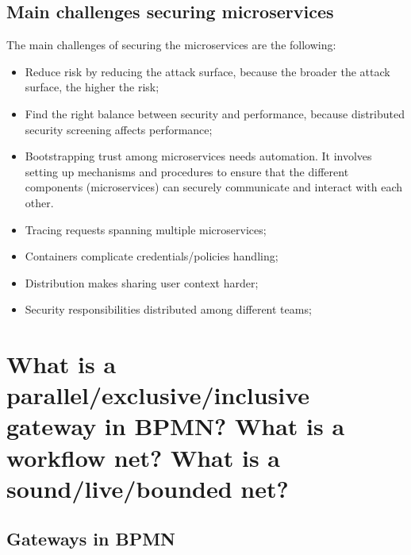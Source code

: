 \subsection{Main challenges securing microservices}
The main challenges of securing the microservices are the following:
\begin{itemize}
   \item Reduce risk by reducing the attack surface, because the broader the attack surface, the higher the risk;
   \item Find the right balance between security and performance, because distributed security screening affects performance;
   \item Bootstrapping trust among microservices needs automation. It involves setting up mechanisms and procedures to ensure that the different components (microservices) can securely communicate and interact with each other.
   \item Tracing requests spanning multiple microservices;
   \item Containers complicate credentials/policies handling;
   \item Distribution makes sharing user context harder;
   \item Security responsibilities distributed among different teams;
\end{itemize}

\section{What is a parallel/exclusive/inclusive gateway in BPMN? What is a workflow net? What is a sound/live/bounded net?}
\subsection{Gateways in BPMN}


